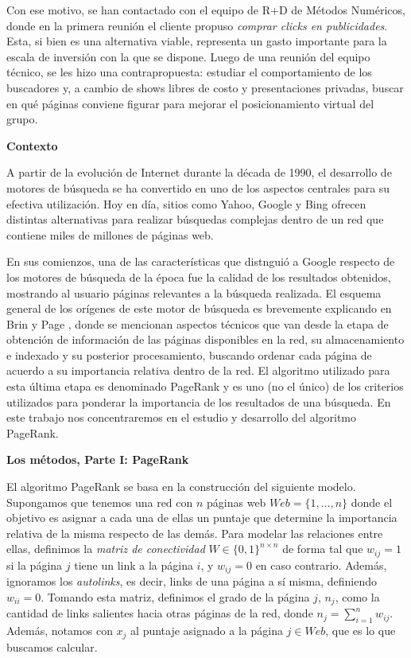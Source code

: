 \documentclass[11pt, a4paper]{article}
\begin{document}
Con ese motivo, se han contactado con el equipo de R+D de M\'etodos Num\'ericos, donde en la primera reuni\'on el cliente propuso
\emph{comprar clicks en publicidades}. Esta, si bien es una alternativa viable, representa un gasto importante para la escala de
inversi\'on con la que se dispone. Luego de una reuni\'on del equipo t\'ecnico, se les hizo una contrapropuesta:
estudiar el comportamiento de los buscadores y, a cambio de shows libres de costo y presentaciones privadas, buscar en qu\'e
p\'aginas conviene figurar para mejorar el posicionamiento virtual del grupo.
 
\vskip 5pt
\noindent\textbf{Contexto}
\vskip 5pt

A partir de la evoluci\'on de Internet durante la d\'ecada de 1990, el desarrollo de motores de b\'usqueda se ha convertido
en uno de los aspectos centrales para su efectiva utilizaci\'on. Hoy en d\'ia, sitios como Yahoo, Google y Bing ofrecen
distintas alternativas para realizar b\'usquedas complejas dentro de un red que contiene miles de millones de p\'aginas
web. 

En sus comienzos, una de las caracter\'isticas que distngui\'o a Google respecto de los motores de b\'usqueda de la \'epoca
fue la calidad de los resultados obtenidos, mostrando al usuario p\'aginas relevantes a la
b\'usqueda realizada. El esquema general de los or\'igenes de este motor de b\'usqueda es brevemente explicando en 
Brin y Page \cite{Brin1998}, donde se mencionan aspectos t\'ecnicos que van desde la etapa de obtenci\'on de
informaci\'on de las p\'aginas disponibles en la red, su almacenamiento e indexado y su posterior procesamiento,
buscando ordenar cada p\'agina de acuerdo a su importancia relativa dentro de la red. El algoritmo utilizado para esta
\'ultima etapa es denominado PageRank y es uno (no el \'unico) de los criterios utilizados para ponderar la importancia
de los resultados de una b\'usqueda. En este trabajo nos concentraremos en el estudio y desarrollo del algoritmo
PageRank.

\vskip 5pt
\noindent\textbf{Los m\'etodos, Parte I: PageRank}
\vskip 5pt

El algoritmo PageRank se basa en la construcci\'on del siguiente modelo. Supongamos que tenemos una red con $n$ p\'aginas 
web $Web = \{1,\dots,n\}$ donde
el objetivo es asignar a cada una de ellas un puntaje que determine la importancia relativa de la misma respecto de las
dem\'as. Para modelar las relaciones entre ellas, definimos la \emph{matriz de conectividad} $W \in \{0,1\}^{n \times n}$ 
de forma tal que $w_{ij} = 1$ si la p\'agina $j$ tiene un link a la p\'agina $i$, y $w_{ij} = 0$ en caso contrario. 
Adem\'as, ignoramos los \emph{autolinks}, es decir, links de una p\'agina a s\'i misma, definiendo $w_{ii} = 0$. Tomando 
esta matriz, definimos el grado de la p\'agina $j$, $n_j$, como la cantidad de links salientes hacia otras p\'aginas 
de la red, donde $n_j = \sum_{i = 1}^n w_{ij}$. Adem\'as, notamos con $x_j$ al puntaje asignado a la p\'agina $j\in
Web$, que es lo que buscamos calcular.
\end{document}
